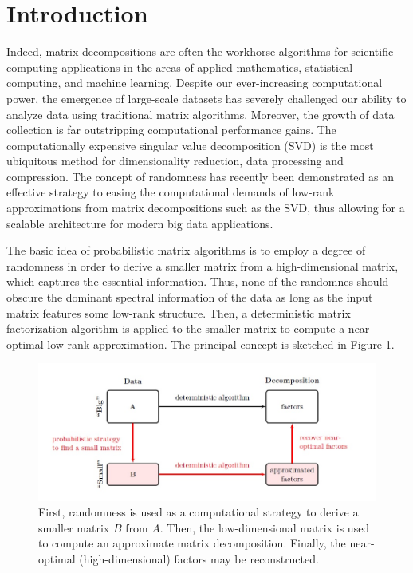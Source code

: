 \documentclass[a4paper,10pt]{article}
\begin{document}
\section{Introduction}
Indeed, matrix decompositions are often the workhorse algorithms for scientific computing applications in the areas of applied mathematics, statistical computing, and machine learning. Despite our ever-increasing computational power, the emergence of large-scale datasets has severely challenged our ability to analyze data using traditional matrix algorithms. Moreover, the growth of data collection is far outstripping computational performance gains. The computationally expensive singular value decomposition (SVD) is the most ubiquitous method for dimensionality reduction, data processing and compression. The concept of randomness has recently been demonstrated as an effective strategy to easing the computational demands of low-rank approximations from matrix decompositions such as the SVD, thus allowing for a scalable architecture for modern big data applications.

The basic idea of probabilistic matrix algorithms is to employ a degree of randomness in order to derive a smaller matrix from a high-dimensional matrix, which captures the essential information. Thus, none of the randomnes should obscure the dominant spectral information of the data as long as the input matrix features some low-rank structure. Then, a deterministic matrix factorization algorithm is applied to the smaller matrix to compute a near-optimal low-rank approximation. The principal concept is sketched in Figure 1.

\begin{figure}
	\includegraphics[scale=0.5]{fig1.jpg}
	\caption{First, randomness is used as a computational strategy to derive a smaller matrix
		$B$ from $A$. Then, the low-dimensional matrix is used to compute an approximate matrix
		decomposition. Finally, the near-optimal (high-dimensional) factors may be reconstructed.}
	\label{fig1}
\end{figure}
\end{document}
